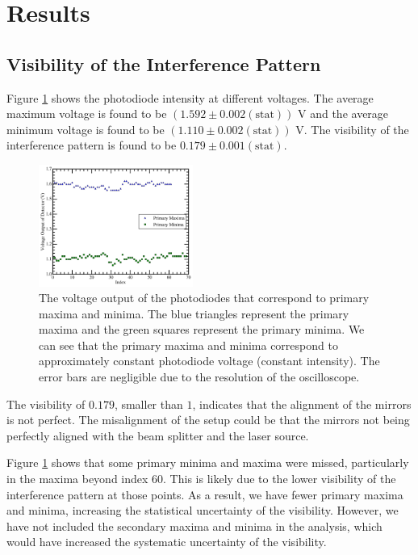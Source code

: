 \section{Results}
\subsection{Visibility of the Interference Pattern}

Figure \ref{fig:intensity} shows the photodiode intensity at different voltages. The average maximum voltage is found to be $(1.592\pm0.002(\text{stat})) \text{ V}$ and the average minimum voltage is found to be $(1.110\pm0.002(\text{stat})) \text{ V}$. The visibility of the interference pattern is found to be $0.179\pm0.001(\text{stat})$.
\begin{figure}[h]
    \centering
    \includegraphics[width=0.45\textwidth]{fig/Intensity.png}
    \caption{The voltage output of the photodiodes that correspond to primary maxima and minima. The blue triangles represent the primary maxima and the green squares represent the primary minima. We can see that the primary maxima and minima correspond to approximately constant photodiode voltage (constant intensity). The error bars are negligible due to the resolution of the oscilloscope.}
    \label{fig:intensity}
\end{figure}

The visibility of $0.179$, smaller than $1$, indicates that the alignment of the mirrors is not perfect. The misalignment of the setup could be that the mirrors not being perfectly aligned with the beam splitter and the laser source.

Figure \ref{fig:intensity} shows that some primary minima and maxima were missed, particularly in the maxima beyond index 60. This is likely due to the lower visibility of the interference pattern at those points. As a result, we have fewer primary maxima and minima, increasing the statistical uncertainty of the visibility. However, we have not included the secondary maxima and minima in the analysis, which would have increased the systematic uncertainty of the visibility. 


